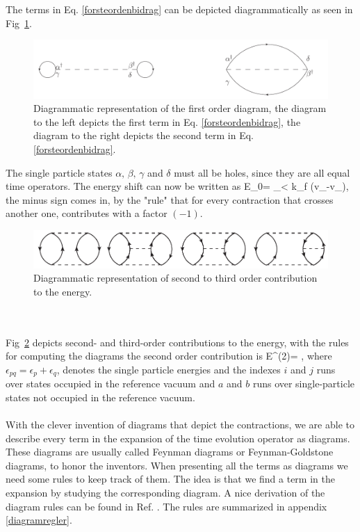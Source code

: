 \label{forsteordenbidrag}
\ee
The terms in Eq. \eqref{forsteordenbidrag} can be depicted diagrammatically 
as seen in Fig~\ref{forsteordendiagram}.
\begin{figure}[htp]
\centering
\includegraphics[scale=0.5]{forsteordendiagram}  %
\caption{Diagrammatic representation of the first order diagram, the diagram to the left depicts the first term in Eq. \eqref{forsteordenbidrag}, the 
diagram to the right depicts the second term in Eq. \eqref{forsteordenbidrag}.}
\label{forsteordendiagram}
\end{figure}
The single particle states $\alpha, \, \beta, \, \gamma$ and $\delta$ must all be holes, since they are all equal time operators.
The energy shift can now be written as 
\be
\Delta E_0=	 \sum_{\alpha\beta < k_f} (v_{\alpha\beta\alpha\beta}-v_{\alpha\beta\beta\alpha}),
\ee
the minus sign comes in, by the "rule" that for every contraction that crosses
another one, contributes with a factor $(-1).$
\begin{figure}[htp]
\centering
\includegraphics[scale=0.5]{perturbdiag}  %
\caption{Diagrammatic representation of second to third order contribution to the energy.}
\label{perturbdiagdiagram}
\end{figure}\\
\\
Fig~\ref{perturbdiagdiagram} depicts second- and third-order contributions to
the energy, with the rules for computing the diagrams 
the second order contribution is
\be
\Delta E^{(2)}= ,
\ee
where $\epsilon_{pq}=\epsilon_p + \epsilon_q$, denotes the single particle 
energies and the indexes $i$ and $j$ runs over states occupied in the reference vacuum and $a$ and $b$ runs over single-particle states not occupied in the reference vacuum.\\
\\
With the clever invention of diagrams that depict the contractions, we are
able to describe every term in the expansion of the time evolution operator as
diagrams. These diagrams are usually called Feynman diagrams or
Feynman-Goldstone diagrams, to honor the inventors.  When presenting all the
terms as diagrams we need some rules to keep track of them. The idea is that we
find a term in the expansion by studying the corresponding diagram. A nice derivation of the diagram
rules can be found in Ref. \cite{kuo1981}.  The rules are summarized in appendix
\ref{diagramregler}. 




